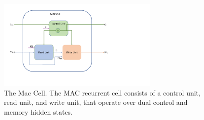 \begin{figure}[htbp]
	\centering
	\includegraphics[width=0.7\textwidth]{img/mac_cell.pdf}
	\caption{The Mac Cell. The MAC recurrent cell consists of a control unit, read unit, and write unit, that operate over dual control and memory hidden states. }
	\label{fig:mac_cell}
\end{figure}







